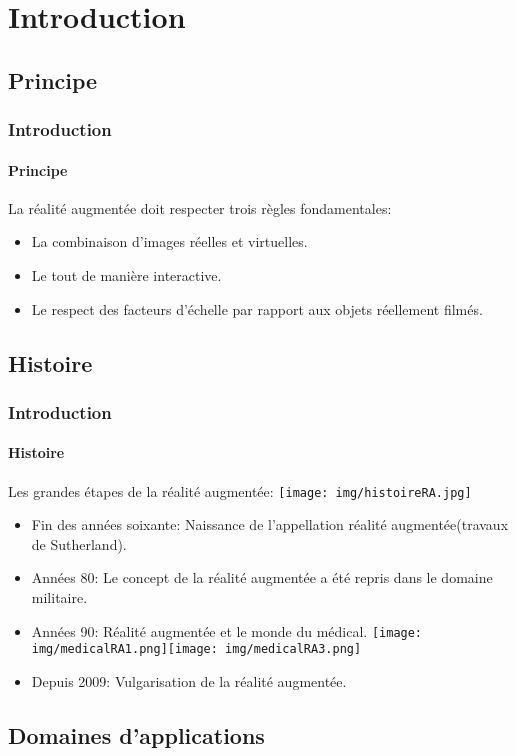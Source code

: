\section{Introduction}
\subsection{Principe}

\begin{frame}
\frametitle{Introduction}
\framesubtitle{Principe}
La réalité augmentée doit respecter trois règles fondamentales:\\
\begin{itemize}
		\item{La combinaison d'images réelles et virtuelles.}
		\item{Le tout de manière interactive.}
		\item{Le respect des facteurs d'échelle par rapport aux objets réellement filmés.}
\end{itemize}
\end{frame}

\subsection{Histoire}

\begin{frame}
\frametitle{Introduction}
\framesubtitle{Histoire}
Les grandes étapes de la réalité augmentée: \texttt{[image: img/histoireRA.jpg]}\\
\begin{itemize}
		\item{Fin des années soixante: Naissance de l'appellation réalité augmentée(travaux de Sutherland).}
		\item{Années 80: Le concept de la réalité augmentée a été repris dans le domaine militaire.}
		\item{Années 90: Réalité augmentée et le monde du médical.}
		\texttt{[image: img/medicalRA1.png]}\texttt{[image: img/medicalRA3.png]}
		\item{Depuis 2009: Vulgarisation de la réalité augmentée.}
\end{itemize}
\end{frame}

\subsection{Domaines d'applications}

